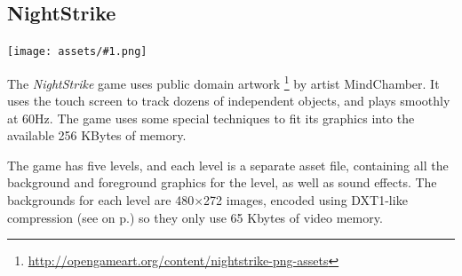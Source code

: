 \documentclass[10pt]{book}
\newcommand{\png}[1]{
\begin{center}
\texttt{[image: assets/\#1.png]}
\end{center}
}
\newcommand{\xref}[1]{\textit{\nameref{#1}} on  p.\pageref{#1}}
\begin{document}
\begin{CJK}{UTF8}{gkai}
\newpage
\section{NightStrike}
\label{nightstrike}

\png{nightstrike}

The \textit{NightStrike} game uses public domain artwork
\footnote{\url{http://opengameart.org/content/nightstrike-png-assets}}
by artist MindChamber.
It uses the touch screen to track dozens of independent objects,
and plays smoothly at 60Hz.
The game uses some special techniques to fit its graphics into the available 256 KBytes of memory.

The game has five levels, and each level is a separate asset file, containing all the background and foreground graphics
for the level, as well as sound effects.
The backgrounds for each level are 480$\times$272 images, encoded using DXT1-like compression
(see \xref{dxt1})
so they only use 65 Kbytes of video memory.


\end{CJK}
\end{document}
